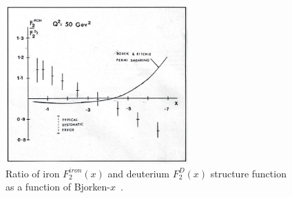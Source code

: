 \begin{figure}[!ht]
  \centering
  \includegraphics[width=7cm]{FigCap2/EMC.jpg}
  \caption{Ratio of iron $F^{iron}_2(x)$ and deuterium $F^D_2(x)$ structure function as a function of Bjorken-$x$~\cite{Aubert:1983xm}.%
  }
  \label{fig:EMC}
\end{figure}




